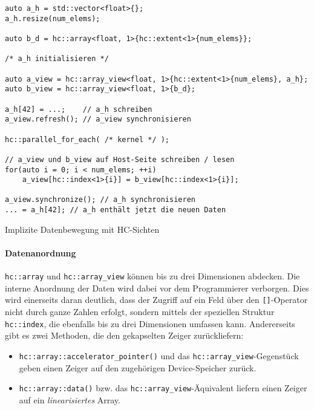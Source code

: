 \begin{code}
    \begin{verbatim}
auto a_h = std::vector<float>{};
a_h.resize(num_elems);

auto b_d = hc::array<float, 1>{hc::extent<1>{num_elems}};

/* a_h initialisieren */

auto a_view = hc::array_view<float, 1>{hc::extent<1>{num_elems}, a_h};
auto b_view = hc::array_view<float, 1>{b_d};

a_h[42] = ...;    // a_h schreiben
a_view.refresh(); // a_view synchronisieren

hc::parallel_for_each( /* kernel */ );

// a_view und b_view auf Host-Seite schreiben / lesen
for(auto i = 0; i < num_elems; ++i)
    a_view[hc::index<1>{i}] = b_view[hc::index<1>{i}];

a_view.synchronize(); // a_h synchronisieren
... = a_h[42]; // a_h enthält jetzt die neuen Daten
    \end{verbatim}
    \caption{Implizite Datenbewegung mit HC-Sichten}
    \label{vergleich:hc:datensicht:implizitebewegung}
\end{code}

\paragraph{Datenanordnung}

\texttt{hc::array} und \texttt{hc::array\_view} können bis zu drei Dimensionen
abdecken. Die interne Anordnung der Daten wird dabei vor dem Programmierer
verborgen. Dies wird einerseits daran deutlich, dass der Zugriff auf ein Feld
über den \texttt{[]}-Operator nicht durch ganze Zahlen erfolgt, sondern mittels
der speziellen Struktur \texttt{hc::index}, die ebenfalls bis zu drei
Dimensionen umfassen kann. Andererseits gibt es zwei Methoden, die den
gekapselten Zeiger zurückliefern:

\begin{itemize}
    \item \texttt{hc::array::accelerator\_pointer()} und das
          \texttt{hc::array\_view}-Gegenstück geben einen Zeiger auf den
          zugehörigen Device-Speicher zurück.
    \item \texttt{hc::array::data()} bzw. das
          \texttt{hc::array\_view}-Äquivalent liefern einen Zeiger auf ein
          \textit{linearisiertes} Array.
\end{itemize}

